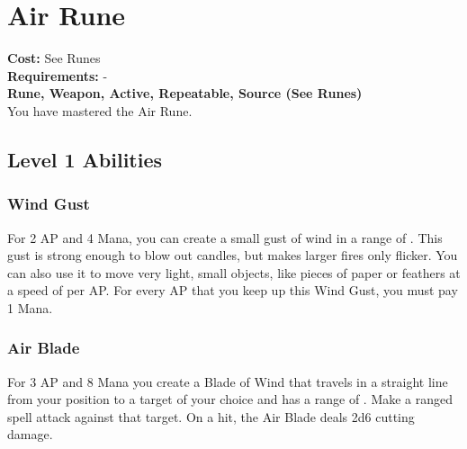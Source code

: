 \twocolumn
\section{Air Rune}\label{rune:air}
\textbf{Cost:} See Runes\\
\textbf{Requirements:} -\\
\textbf{Rune, Weapon, Active, Repeatable, Source (See Runes)}\\
You have mastered the Air Rune.

\subsection{Level 1 Abilities}

\subsubsection{Wind Gust}
For 2 AP and 4 Mana, you can create a small gust of wind in a range of .
This gust is strong enough to blow out candles, but makes larger fires only flicker.
You can also use it to move very light, small objects, like pieces of paper or feathers at a speed of  per AP.
For every AP that you keep up this Wind Gust, you must pay 1 Mana.

\subsubsection{Air Blade}
For 3 AP and 8 Mana you create a Blade of Wind that travels in a straight line from your position to a target of your choice and has a range of .
Make a ranged spell attack against that target.
On a hit, the Air Blade deals 2d6 cutting damage.